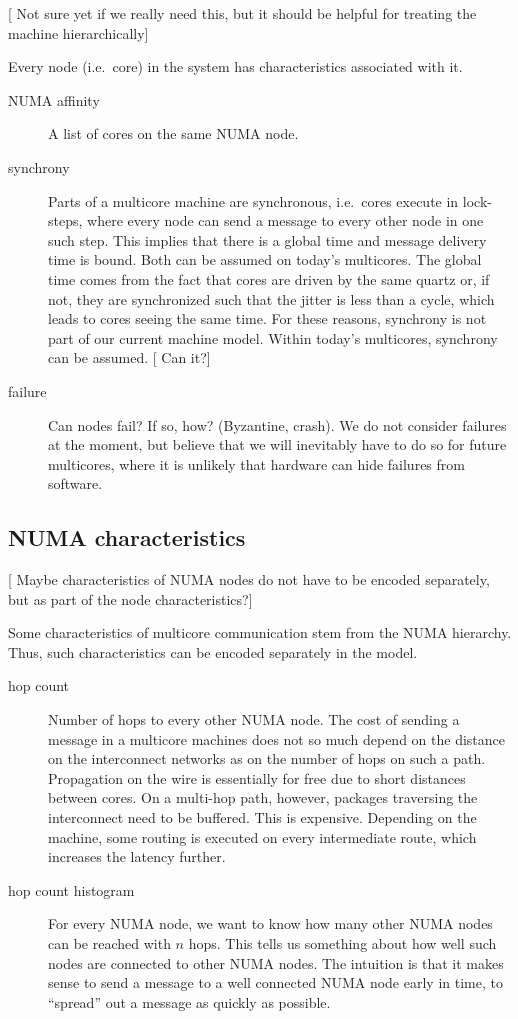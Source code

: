 \documentclass{article}
\newcommand{\stefan}[1]{
  {\color{skRed}[{\color{red}{SK}} #1]}}
\begin{document}
\stefan{Not sure yet if we really need this, but it should be helpful
  for treating the machine hierarchically}

Every node (i.e.\ core) in the system has characteristics associated
with it.

\begin{description}
\item[NUMA affinity] A list of cores on the same NUMA node.
\item[synchrony] Parts of a multicore machine are synchronous, i.e.\
  cores execute in lock-steps, where every node can send a message to
  every other node in one such step. This implies that there is a
  global time and message delivery time is bound. Both can be assumed
  on today's multicores. The global time comes from the fact that
  cores are driven by the same quartz or, if not, they are
  synchronized such that the jitter is less than a cycle, which leads
  to cores seeing the same time. %
  For these reasons, synchrony is not part of our current machine
  model. Within today's multicores, synchrony can be
  assumed. \stefan{Can it?}
\item[failure] Can nodes fail? If so, how? (Byzantine, crash). We do
  not consider failures at the moment, but believe that we will
  inevitably have to do so for future multicores, where it is unlikely
  that hardware can hide failures from software.
\end{description}

\subsection{NUMA characteristics}
\label{sec:model_numa_nodes}

\stefan{Maybe characteristics of NUMA nodes do not have to be encoded
  separately, but as part of the node characteristics?}

Some characteristics of multicore communication stem from the NUMA
hierarchy. Thus, such characteristics can be encoded separately in the
model.

\begin{description}
\item[hop count] Number of hops to every other NUMA node. The cost of
  sending a message in a multicore machines does not so much depend on
  the distance on the interconnect networks as on the number of hops
  on such a path. Propagation on the wire is essentially for free due
  to short distances between cores. %
  On a multi-hop path, however, packages traversing the interconnect
  need to be buffered. This is expensive. Depending on the machine,
  some routing is executed on every intermediate route, which
  increases the latency further.
\item[hop count histogram] For every NUMA node, we want to know how
  many other NUMA nodes can be reached with $n$ hops. This tells us
  something about how well such nodes are connected to other NUMA
  nodes. The intuition is that it makes sense to send a message to a
  well connected NUMA node early in time, to ``spread'' out a message
  as quickly as possible.
\end{description}
\end{document}

